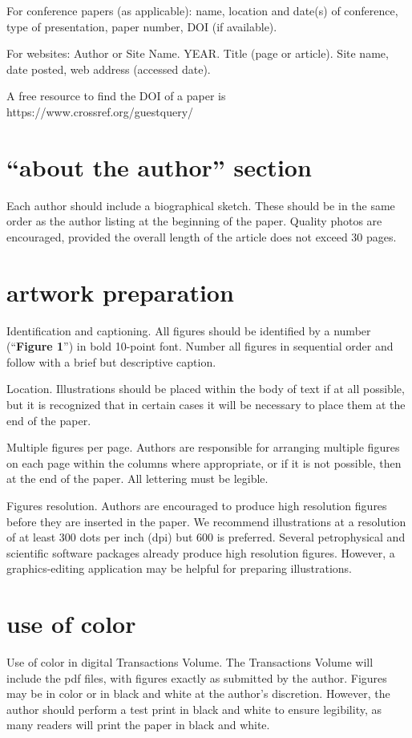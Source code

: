 \documentclass[10pt,twocolumn,twoside]{article}
\begin{document}
For conference papers (as applicable): name, location and date(s) of conference, type of presentation, paper number, DOI (if available). 

For websites: Author or Site Name. YEAR. Title (page or article). Site name, date posted, web address (accessed date). 

A free resource to find the DOI of a paper is https://www.crossref.org/guestquery/ 

\section{“about the author” section}
Each author should include a biographical sketch. These should be in the same order as the author listing at the beginning of the paper. Quality photos are encouraged, provided the overall length of the article does not exceed 30 pages.

\section{artwork preparation}
Identification and captioning. All figures should be identified by a number (“\textbf{Figure 1}”) in bold 10-point font. Number all figures in sequential order and follow with a brief but descriptive caption. 

Location. Illustrations should be placed within the body of text if at all possible, but it is recognized that in certain cases it will be necessary to place them at the end of the paper.

Multiple figures per page. Authors are responsible for arranging multiple figures on each page within the columns where appropriate, or if it is not possible, then at the end of the paper. All lettering must be legible.

Figures resolution. Authors are encouraged to produce high resolution figures before they are inserted in the paper. We recommend illustrations at a resolution of at least 300 dots per inch (dpi) but 600 is preferred. Several petrophysical and scientific software packages already produce high resolution figures. However, a graphics-editing application may be helpful for preparing illustrations. 

\section{use of color}
Use of color in digital Transactions Volume. The Transactions Volume will include the pdf files, with figures exactly as submitted by the author. Figures may be in color or in black and white at the author’s discretion. However, the author should perform a test print in black and white to ensure legibility, as many readers will print the paper in black and white. 
\end{document}
